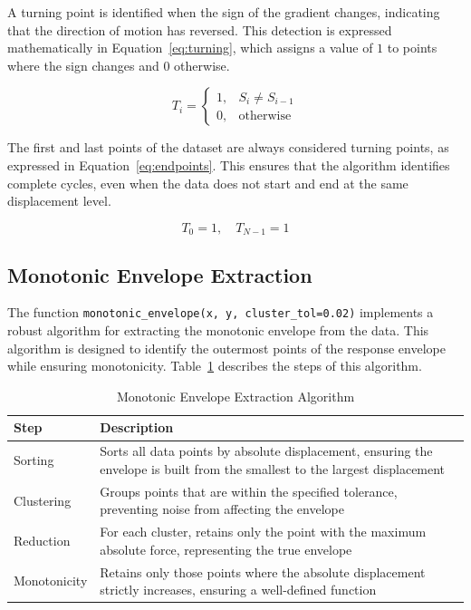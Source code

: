 \documentclass[11pt,a4paper]{article}
\begin{document}
A turning point is identified when the sign of the gradient changes, indicating that the direction of motion has reversed. This detection is expressed mathematically in Equation~\ref{eq:turning}, which assigns a value of \(1\) to points where the sign changes and \(0\) otherwise.

\begin{equation}
T_i = 
\begin{cases}
1, & S_i \neq S_{i-1} \\
0, & \text{otherwise}
\end{cases}
\label{eq:turning}
\end{equation}

The first and last points of the dataset are always considered turning points, as expressed in Equation~\ref{eq:endpoints}. This ensures that the algorithm identifies complete cycles, even when the data does not start and end at the same displacement level.

\begin{equation}
T_0 = 1, \quad T_{N-1} = 1
\label{eq:endpoints}
\end{equation}

\subsection{Monotonic Envelope Extraction}

The function \texttt{monotonic\_envelope(x, y, cluster\_tol=0.02)} implements a robust algorithm for extracting the monotonic envelope from the data. This algorithm is designed to identify the outermost points of the response envelope while ensuring monotonicity. Table~\ref{tab:envelope_algorithm} describes the steps of this algorithm.

\begin{table}[h]
\centering
\caption{Monotonic Envelope Extraction Algorithm}\label{tab:envelope_algorithm}
\begin{tabular}{p{4cm}p{10cm}}
\toprule
\textbf{Step} & \textbf{Description} \\
\midrule
Sorting & Sorts all data points by absolute displacement, ensuring the envelope is built from the smallest to the largest displacement \\
Clustering & Groups points that are within the specified tolerance, preventing noise from affecting the envelope \\
Reduction & For each cluster, retains only the point with the maximum absolute force, representing the true envelope \\
Monotonicity & Retains only those points where the absolute displacement strictly increases, ensuring a well-defined function \\
\bottomrule
\end{tabular}
\end{table}
\end{document}

